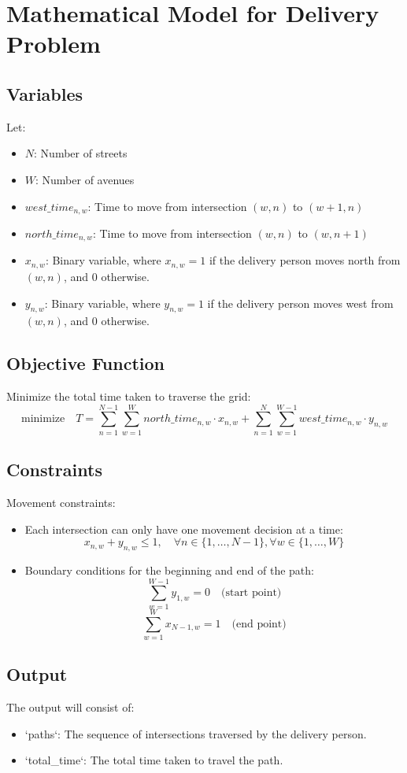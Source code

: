 \documentclass{article}
\begin{document}
\section*{Mathematical Model for Delivery Problem}

\subsection*{Variables}
Let:
\begin{itemize}
    \item $N$: Number of streets
    \item $W$: Number of avenues
    \item $west\_time_{n,w}$: Time to move from intersection $(w, n)$ to $(w+1, n)$
    \item $north\_time_{n,w}$: Time to move from intersection $(w, n)$ to $(w, n+1)$
    \item $x_{n,w}$: Binary variable, where $x_{n,w} = 1$ if the delivery person moves north from $(w, n)$, and $0$ otherwise.
    \item $y_{n,w}$: Binary variable, where $y_{n,w} = 1$ if the delivery person moves west from $(w, n)$, and $0$ otherwise.
\end{itemize}

\subsection*{Objective Function}
Minimize the total time taken to traverse the grid:
\[
\text{minimize} \quad T = \sum_{n=1}^{N-1} \sum_{w=1}^{W} north\_time_{n,w} \cdot x_{n,w} + \sum_{n=1}^{N} \sum_{w=1}^{W-1} west\_time_{n,w} \cdot y_{n,w}
\]

\subsection*{Constraints}
Movement constraints:
\begin{itemize}
    \item Each intersection can only have one movement decision at a time:
    \[
    x_{n,w} + y_{n,w} \leq 1, \quad \forall n \in \{1, \ldots, N-1\}, \forall w \in \{1, \ldots, W\}
    \]
    \item Boundary conditions for the beginning and end of the path:
    \[
    \sum_{w=1}^{W-1} y_{1,w} = 0 \quad \text{(start point)}
    \]
    \[
    \sum_{w=1}^{W} x_{N-1,w} = 1 \quad \text{(end point)}
    \]
\end{itemize}

\subsection*{Output}
The output will consist of:
\begin{itemize}
    \item `paths`: The sequence of intersections traversed by the delivery person.
    \item `total_time`: The total time taken to travel the path.
\end{itemize}
\end{document}
